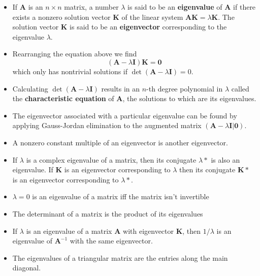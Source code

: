 \documentclass{article}
\begin{document}
\begin{itemize}
  \item If $\mathbf{A}$ is an $n \times n$ matrix, a number $\lambda$ is said to be an \textbf{eigenvalue} of $\mathbf{A}$ if there exists a nonzero solution vector $\mathbf{K}$ of the linear system $\mathbf{A} \mathbf{K} = \lambda \mathbf{K}$. The solution vector $\mathbf{K}$ is said to be an \textbf{eigenvector} corresponding to the eigenvalue $\lambda$.

  \item Rearranging the equation above we find \[(\mathbf{A} - \lambda \mathbf{I}) \mathbf{K} = \mathbf{0}\] which only has nontrivial solutions if $\det (\mathbf{A} - \lambda \mathbf{I}) = 0$.

  \item Calculating $\det (\mathbf{A} - \lambda \mathbf{I})$ results in an $n$-th degree polynomial in $\lambda$ called the \textbf{characteristic equation} of $\mathbf{A}$, the solutions to which are its eigenvalues.

  \item The eigenvector associated with a particular eigenvalue can be found by applying Gauss-Jordan elimination to the augmented matrix $(\mathbf{A} - \lambda \mathbf{I} | \mathbf{0})$.

  \item A nonzero constant multiple of an eigenvector is another eigenvector.

  \item If $\lambda$ is a complex eigenvalue of a matrix, then its conjugate $\lambda*$ is also an eigenvalue. If $\mathbf{K}$ is an eigenvector corresponding to $\lambda$ then its conjugate $\mathbf{K}*$ is an eigenvector corresponding to $\lambda*$.

  \item $\lambda = 0$ is an eigenvalue of a matrix iff the matrix isn't invertible

  \item The determinant of a matrix is the product of its eigenvalues

  \item If $\lambda$ is an eigenvalue of a matrix $\mathbf{A}$ with eigenvector $\mathbf{K}$, then $1 / \lambda$ is an eigenvalue of $\mathbf{A}^{-1}$ with the same eigenvector.

  \item The eigenvalues of a triangular matrix are the entries along the main diagonal.
\end{itemize}
\end{document}
